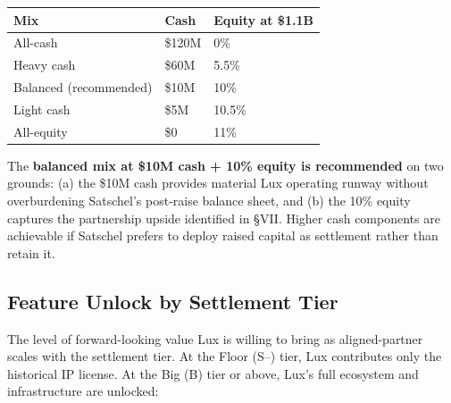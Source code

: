 \documentclass[11pt,letterpaper]{article}
\begin{document}
\begin{center}
\begin{tabular}{lll}
\toprule
\textbf{Mix} & \textbf{Cash} & \textbf{Equity at \$1.1B} \\
\midrule
All-cash & \$120M & 0\% \\
Heavy cash & \$60M & 5.5\% \\
Balanced (recommended) & \$10M & 10\% \\
Light cash & \$5M & 10.5\% \\
All-equity & \$0 & 11\% \\
\bottomrule
\end{tabular}
\end{center}

The \textbf{balanced mix at \$10M cash + 10\% equity is recommended}
on two grounds: (a) the \$10M cash provides material Lux operating
runway without overburdening Satschel's post-raise balance sheet,
and (b) the 10\% equity captures the partnership upside identified
in \S VII. Higher cash components are achievable if Satschel
prefers to deploy raised capital as settlement rather than retain it.

\subsection*{Feature Unlock by Settlement Tier}

The level of forward-looking value Lux is willing to bring as
aligned-partner scales with the settlement tier. At the Floor (S--)
tier, Lux contributes only the historical IP license. At the Big
(B) tier or above, Lux's full ecosystem and infrastructure are
unlocked:
\end{document}
